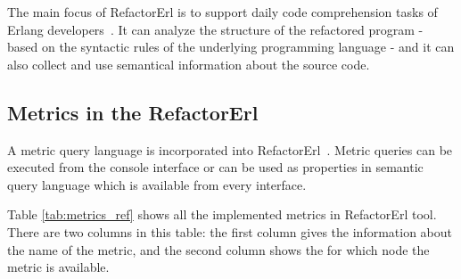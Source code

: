 The main focus of RefactorErl is to support daily code comprehension tasks of Erlang developers~\cite{refactorerl}. It can analyze the structure of the refactored program - based on the syntactic rules of the underlying programming language - and it can also collect and use semantical information about the source code.

\subsection{Metrics in the RefactorErl}

A metric query language is incorporated into RefactorErl~\cite{refactorerl}. Metric queries can be executed from the console interface or can be used as properties in semantic query language which is available from every interface.

Table \ref{tab:metrics_ref} shows all the implemented metrics in RefactorErl tool. There are two columns in this table: the first column gives the information about the name of the metric, and the second column shows the for which node the metric is available.

